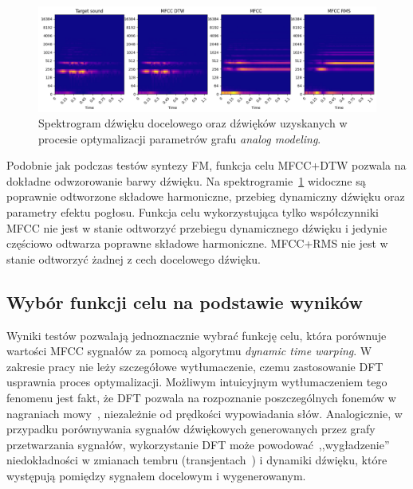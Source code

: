 \begin{figure}[H]
    \centering
    \includegraphics[width=1.0\linewidth]{rys03/spectro_results_am.png}
    \caption{
      Spektrogram dźwięku docelowego oraz dźwięków uzyskanych w procesie
      optymalizacji parametrów grafu \textit{analog modeling}.
    }\label{fig:am_param_optimisation_results_spectrograms}
\end{figure}

Podobnie jak podczas testów syntezy FM, funkcja celu MFCC+DTW pozwala na dokładne odwzorowanie barwy dźwięku.
Na spektrogramie~\ref{fig:am_param_optimisation_results_spectrograms} widoczne są poprawnie odtworzone
składowe harmoniczne, przebieg dynamiczny dźwięku oraz parametry efektu pogłosu. Funkcja celu wykorzystująca
tylko współczynniki MFCC nie jest w stanie odtworzyć przebiegu dynamicznego dźwięku i jedynie częściowo odtwarza
poprawne składowe harmoniczne. MFCC+RMS nie jest w stanie odtworzyć żadnej z cech docelowego dźwięku.

\subsection{Wybór funkcji celu na podstawie wyników}

Wyniki testów pozwalają jednoznacznie wybrać funkcję celu, która porównuje wartości MFCC
sygnałów za pomocą algorytmu \textit{dynamic time warping}. W zakresie pracy nie leży szczegółowe
wytłumaczenie, czemu zastosowanie DFT usprawnia proces optymalizacji. Możliwym intuicyjnym
wytłumaczeniem tego fenomenu jest fakt, że DFT pozwala na rozpoznanie poszczególnych
fonemów w nagraniach mowy~\cite{mfcc_dtw}, niezależnie od prędkości wypowiadania słów. 
Analogicznie, w przypadku porównywania sygnałów dźwiękowych generowanych przez grafy
przetwarzania sygnałów, wykorzystanie DFT może powodować~,,wygładzenie'' niedokładności
w zmianach tembru (transjentach~\cite{transient_music_theory}) i dynamiki dźwięku,
które występują pomiędzy sygnałem docelowym i wygenerowanym.
